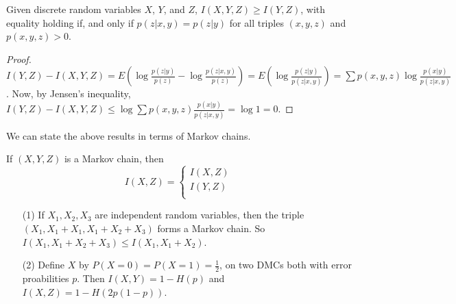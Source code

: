 \begin{theorem}\label{2.1.8}
    Given discrete random variables $X$,  $Y$, and  $Z$,  $I(X,Y,Z) \geq
    I(Y,Z)$, with equality holding if, and only if $p(z|x,y)=p(z|y)$ for all
    triples $(x,y,z)$ and $p(x,y,z)>0$.
\end{theorem}
\begin{proof}
    $I(Y,Z)-I(X,Y,Z)=E(\log{\frac{p(z|y)}{p(z)}}-\log{\frac{p(z|x,y)}{p(z)}})=
    E(\log{\frac{p(z|y)}{p(z|x,y)}})=\sum{p(x,y,z)\log{\frac{p(x|y)}{p(z|x,y)}}}$.
    Now, by Jensen's inequality, $I(Y,Z)-I(X,Y,Z) \leq \log{\sum{p(x,y,
    z)\frac{p(x|y)}{p(z|x,y)}}}=\log{1}=0$.
\end{proof}

We can state the above results in terms of Markov chains.

\begin{theorem}\label{2.1.9}
    If $(X,Y,Z)$ is a Markov chain, then
    \begin{equation}
        I(X,Z)=\begin{cases}
                    I(X,Z)  \\
                    I(Y,Z)  \\
               \end{cases}
    \end{equation}
\end{theorem}

\begin{example}
    \begin{enumerate}
        \item[(1)]If $X_1,X_2,X_3$ are independent random variables, then the triple
        $(X_1,X_1+X_1,X_1+X_2+X_3)$ forms a Markov chain. So $I(X_1,X_1+X_2+X_3)
        \leq I(X_1,X_1+X_2)$.

    \item[(2)] Define $X$ by  $P(X=0)=P(X=1)=\frac{1}{2}$, on two DMCs both
        with error proabilities  $p$. Then  $I(X,Y)=1-H(p)$ and
        $I(X,Z)=1-H(2p(1-p))$.
    \end{enumerate}
\end{example}

